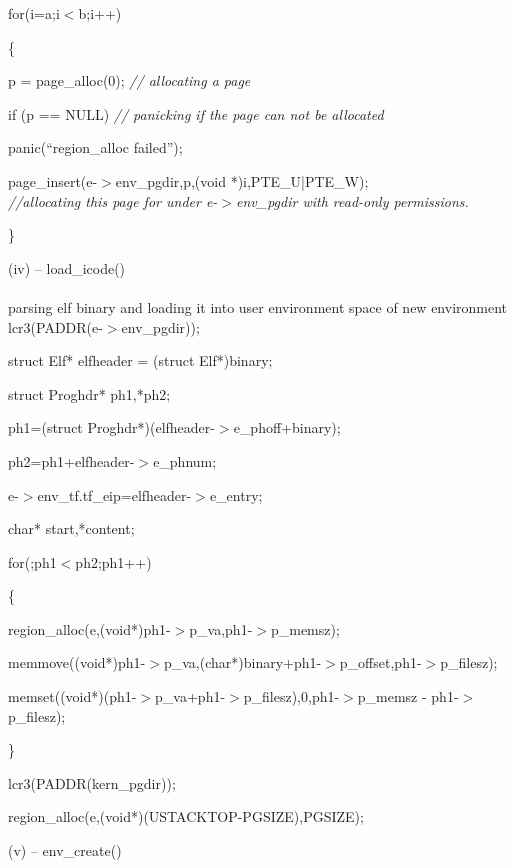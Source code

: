 \documentclass[a4paper,portrait,12pt]{article}
\begin{document}
	for(i=a;i$<$b;i++)


	\{


		p = page\_alloc(0); \emph{// allocating a page}


		


		if (p == NULL)  \emph{ // panicking if the page can not be allocated}


			panic({``}region\_alloc failed'');


		


		page\_insert(e-$>$env\_pgdir,p,(void *)i,PTE\_U|PTE\_W); \\		\emph{//allocating this page for  under e-$>$env\_pgdir with read-only permissions.}


	


	\}





(iv) -- load\_icode()\\\\parsing elf binary and loading it into user environment space of new environment\\

	lcr3(PADDR(e-$>$env\_pgdir));


	struct Elf* elfheader = (struct Elf*)binary;


	struct Proghdr* ph1,*ph2;


	ph1=(struct Proghdr*)(elfheader-$>$e\_phoff+binary);


	ph2=ph1+elfheader-$>$e\_phnum;


	e-$>$env\_tf.tf\_eip=elfheader-$>$e\_entry;


	char* start,*content;


	for(;ph1$<$ph2;ph1++)


	\{


	       region\_alloc(e,(void*)ph1-$>$p\_va,ph1-$>$p\_memsz);


	       memmove((void*)ph1-$>$p\_va,(char*)binary+ph1-$>$p\_offset,ph1-$>$p\_filesz);


	      memset((void*)(ph1-$>$p\_va+ph1-$>$p\_filesz),0,ph1-$>$p\_memsz - ph1-$>$p\_filesz);


	\}


	lcr3(PADDR(kern\_pgdir));


	region\_alloc(e,(void*)(USTACKTOP-PGSIZE),PGSIZE);





(v) -- env\_create()
\end{document}
